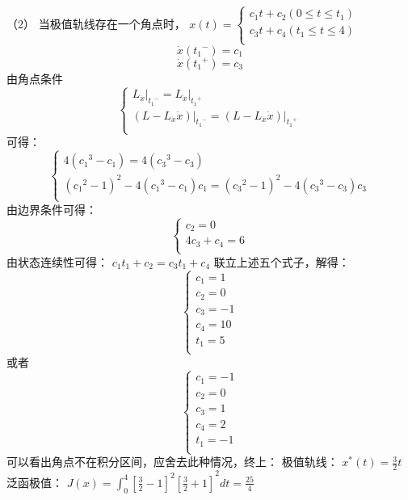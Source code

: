 \documentclass[UTF8]{ctexart}
\begin{document}
（2）		当极值轨线存在一个角点时，
$x\left( t \right)=\left\{ \begin{matrix}
   {{c}_{1}}t+{{c}_{2}}\left( 0\le t\le {{t}_{1}} \right)  \\
   {{c}_{3}}t+{{c}_{4}}\left( {{t}_{1}}\le t\le 4 \right)  \\
\end{matrix} \right.$
\[\dot{x}\left( {{t}_{1}}^{-} \right)={{c}_{1}}\]\[\dot{x}\left( {{t}_{1}}^{+} \right)={{c}_{3}}\]
由角点条件
\[\left\{ \begin{array}{*{35}{l}}
   {{\left. {{L}_{{\dot{x}}}} \right|}_{{{t}_{1}}^{-}}}={{\left. {{L}_{{\dot{x}}}} \right|}_{{{t}_{1}}^{+}}}  \\
   {{\left. \left( L-{{L}_{{\dot{x}}}}\dot{x} \right) \right|}_{{{t}_{1}}^{-}}}={{\left. \left( L-{{L}_{{\dot{x}}}}\dot{x} \right) \right|}_{{{t}_{1}}^{+}}}  \\
\end{array} \right.\]
可得：
\[\left\{ \begin{array}{*{35}{l}}
   4\left( {{c}_{1}}^{3}-{{c}_{1}} \right)=4\left( {{c}_{3}}^{3}-{{c}_{3}} \right)  \\
   {{\left( {{c}_{1}}^{2}-1 \right)}^{2}}-4\left( {{c}_{1}}^{3}-{{c}_{1}} \right){{c}_{1}}={{\left( {{c}_{3}}^{2}-1 \right)}^{2}}-4\left( {{c}_{3}}^{3}-{{c}_{3}} \right){{c}_{3}}  \\
\end{array} \right.\]
由边界条件可得：
\[\left\{ \begin{array}{*{35}{l}}
   {{c}_{2}}=0  \\
   4{{c}_{3}}+{{c}_{4}}=6  \\
\end{array} \right.\]
由状态连续性可得：
${{c}_{1}}{{t}_{1}}+{{c}_{2}}={{c}_{3}}{{t}_{1}}+{{c}_{4}}$
联立上述五个式子，解得：
\[\left\{ \begin{array}{*{35}{l}}
   {{c}_{1}}=1  \\
   {{c}_{2}}=0  \\
   {{c}_{3}}=-1  \\
   {{c}_{4}}=10  \\
   {{t}_{1}}=5  \\
\end{array} \right.\]
或者
\[\left\{ \begin{array}{*{35}{l}}
   {{c}_{1}}=-1  \\
   {{c}_{2}}=0  \\
   {{c}_{3}}=1  \\
   {{c}_{4}}=2  \\
   {{t}_{1}}=-1  \\
\end{array} \right.\]
			可以看出角点不在积分区间，应舍去此种情况，终上：
			极值轨线：
${{x}^{*}}\left( t \right)=\frac{3}{2}t$
			泛函极值：
						$J(x)={{\int_{0}^{4}{{{\left[ \frac{3}{2}-1 \right]}^{2}}\left[ \frac{3}{2}+1 \right]}}^{2}}dt=\frac{25}{4}$
\end{document}
